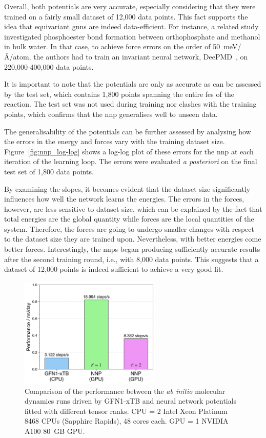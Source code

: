 Overall, both potentials are very accurate, especially considering that they were trained on a fairly small dataset of 12,000 data points. This fact supports the idea that equivariant \acp{gnn} are indeed data-efficient. For instance, a related study~\citep{benayadPrebioticChemicalReactivity2024} investigated phosphoester bond formation between orthophosphate and methanol in bulk water. In that case, to achieve force errors on the order of 50~meV/\AA/atom, the authors had to train an invariant neural network, DeePMD~\citep{zengDeePMDkitV2Software2023}, on 220,000-400,000 data points.

It is important to note that the potentials are only as accurate as can be assessed by the test set, which contains 1,800 points spanning the entire \ac{fes} of the reaction. The test set was not used during training nor clashes with the training points, which confirms that the \ac{nnp} generalises well to unseen data.

The generalisability of the potentials can be further assessed by analysing how the errors in the energy and forces vary with the training dataset size. Figure~\ref{fig:nnp_log-log} shows a log-log plot of these errors for the \ac{nnp} at each iteration of the learning loop. The errors were evaluated \textit{a posteriori} on the final test set of 1,800 data points.

By examining the slopes, it becomes evident that the dataset size significantly influences how well the network learns the energies. The errors in the forces, however, are less sensitive to dataset size, which can be explained by the fact that total energies are the global quantity while forces are the local quantities of the system. Therefore, the forces are going to undergo smaller changes with respect to the dataset size they are trained upon. Nevertheless, with better energies come better forces. Interestingly, the \acp{nnp} began producing sufficiently accurate results after the second training round, i.e., with 8,000 data points. This suggests that a dataset of 12,000 points is indeed sufficient to achieve a very good fit.

\begin{figure}[t]
    \centering
    \includegraphics[width=0.6\textwidth]{Figures/4_Results/results_performance_comparison.png}
    \caption{Comparison of the performance between the \textit{ab initio} molecular dynamics runs driven by GFN1-xTB and neural network potentials fitted with different tensor ranks. CPU = 2 Intel Xeon Platinum 8468 CPUs (Sapphire Rapids), 48 cores each. GPU = 1 NVIDIA A100 80~GB GPU.}
    \label{fig:performance_comparison}
\end{figure}

